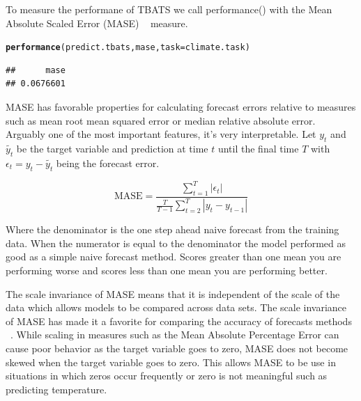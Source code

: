 \documentclass{article}\usepackage[]{graphicx}\usepackage[]{color}
\makeatletter
\newcommand{\hlstd}[1]{\textcolor[rgb]{0.345,0.345,0.345}{#1}}%
\newcommand{\hlkwc}[1]{\textcolor[rgb]{0.333,0.667,0.333}{#1}}%
\newcommand{\hlkwd}[1]{\textcolor[rgb]{0.737,0.353,0.396}{\textbf{#1}}}%
\newenvironment{kframe}{%
 \def\at@end@of@kframe{}%
 \ifinner\ifhmode%
  \def\at@end@of@kframe{\end{minipage}}%
  \begin{minipage}{\columnwidth}%
 \fi\fi%
 \def\FrameCommand##1{\hskip\@totalleftmargin \hskip-\fboxsep
 \colorbox{shadecolor}{##1}\hskip-\fboxsep
     \hskip-\linewidth \hskip-\@totalleftmargin \hskip\columnwidth}%
 \MakeFramed {\advance\hsize-\width
   \@totalleftmargin\z@ \linewidth\hsize
   \@setminipage}}%
 {\par\unskip\endMakeFramed%
 \at@end@of@kframe}
\newenvironment{knitrout}{}{} %
\theoremstyle{definition}
\newcommand\code{\@codex}
\def\@codex#1{{\normalfont\ttfamily\hyphenchar\font=-1 #1}}
\makeatother
\begin{document}
To measure the performane of TBATS we call \code{performance()} with the Mean Absolute Scaled Error (MASE) ~\cite{Hyndman2006} measure.

\begin{knitrout}
\color{fgcolor}\begin{kframe}
\begin{alltt}
\hlkwd{performance}\hlstd{(predict.tbats, mase,} \hlkwc{task} \hlstd{= climate.task)}
\end{alltt}
\begin{verbatim}
##      mase 
## 0.0676601
\end{verbatim}
\end{kframe}
\end{knitrout}

MASE has favorable properties for calculating forecast errors relative to measures such as mean root mean squared error or median relative absolute error. Arguably one of the most important features, it's very interpretable. Let $y_t$ and $\tilde{y_t}$ be the target variable and prediction at time $t$ until the final time $T$ with $\epsilon_t = y_t - \tilde{y_t}$ being the forecast error. 

\begin{equation}
\text{MASE} = \frac{\sum_{t=1}^T |\epsilon_t|}{\frac{T}{T-1} \sum_{t=2}^T |y_t - y_{t-1}|}
\end{equation}

Where the denominator is the one step ahead naive forecast from the training data. When the numerator is equal to the denominator the model performed as good as a simple naive forecast method. Scores greater than one mean you are performing worse and scores less than one mean you are performing better.

The scale invariance of MASE means that it is independent of the scale of the data which allows models to be compared across data sets. The scale invariance of MASE has made it a favorite for comparing the accuracy of forecasts methods ~\cite{noteMase}. While scaling in measures such as the Mean Absolute Percentage Error can cause poor behavior as the target variable goes to zero, MASE does not become skewed when the target variable goes to zero. This allows MASE to be use in situations in which zeros occur frequently or zero is not meaningful such as predicting temperature. 
\end{document}
